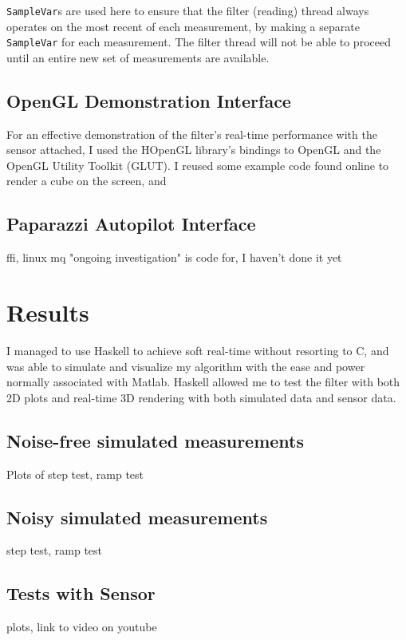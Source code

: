 \documentclass[12pt]{report}
\begin{document}
\lstinline$SampleVar$s are used here to ensure that the filter (reading) thread always operates on the most recent of each measurement, by making a separate \lstinline$SampleVar$ for each measurement. The filter thread will not be able to proceed until an entire new set of measurements are available.

\subsection{OpenGL Demonstration Interface}

For an effective demonstration of the filter's real-time performance with the sensor attached, I used the HOpenGL library's bindings to OpenGL and the OpenGL Utility Toolkit (GLUT). I reused some example code found online to render a cube on the screen, and 

\subsection{Paparazzi Autopilot Interface}
ffi, linux mq
"ongoing investigation" is code for, I haven't done it yet

\section{Results}

I managed to use Haskell to achieve soft real-time without resorting to C, and was able to simulate and visualize my algorithm with the ease and power normally associated with Matlab. Haskell allowed me to test the filter with both 2D plots and real-time 3D rendering with both simulated data and sensor data.

\subsection{Noise-free simulated measurements}
Plots of step test, ramp test
\subsection{Noisy simulated measurements}
step test, ramp test
\subsection{Tests with Sensor}
plots, link to video on youtube
\end{document}
